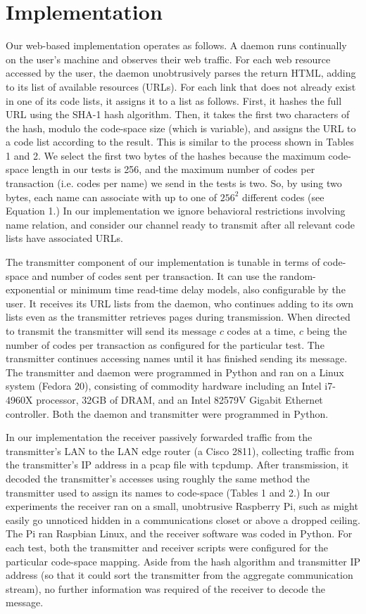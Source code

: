\documentclass[10pt, conference]{IEEEtran}
\begin{document}
\section{Implementation}

Our web-based implementation operates as follows.  A daemon runs continually on the user's machine and observes their web traffic.  For each web resource accessed by the user, the daemon unobtrusively parses the return HTML, adding to its list of available resources (URLs).  For each link that does not already exist in one of its code lists, it assigns it to a list as follows.  First, it hashes the full URL using the SHA-1 hash algorithm.  Then, it takes the first two characters of the hash, modulo the code-space size (which is variable), and assigns the URL to a code list according to the result.  This is similar to the process shown in Tables 1 and 2.  We select the first two bytes of the hashes because the maximum code-space length in our tests is 256, and the maximum number of codes per transaction (i.e. codes per name) we send in the tests is two.  So, by using two bytes, each name can associate with up to one of $256^2$ different codes (see Equation 1.)  In our implementation we ignore behavioral restrictions involving name relation, and consider our channel ready to transmit after all relevant code lists have associated URLs.

The transmitter component of our implementation is tunable in terms of code-space and number of codes sent per transaction.  It can use the random-exponential or minimum time read-time delay models, also configurable by the user. It receives its URL lists from the daemon, who continues adding to its own lists even as the transmitter retrieves pages during transmission.  When directed to transmit the transmitter will send its message $c$ codes at a time, $c$ being the number of codes per transaction as configured for the particular test.  The transmitter continues accessing names until it has finished sending its message.  The transmitter and daemon were programmed in Python and ran on a Linux system (Fedora 20), consisting of commodity hardware including an Intel i7-4960X processor, 32GB of DRAM, and an Intel 82579V Gigabit Ethernet controller.  Both the daemon and transmitter were programmed in Python.

In our implementation the receiver passively forwarded traffic from the transmitter's LAN to the LAN edge router (a Cisco 2811), collecting traffic from the transmitter's IP address in a pcap file with tcpdump.  After transmission, it decoded the transmitter's accesses using roughly the same method the transmitter used to assign its names to code-space (Tables 1 and 2.)  In our experiments the receiver ran on a small, unobtrusive Raspberry Pi, such as might easily go unnoticed hidden in a communications closet or above a dropped ceiling.  The Pi ran Raspbian Linux, and the receiver software was coded in Python.  For each test, both the transmitter and receiver scripts were configured for the particular code-space mapping.  Aside from the hash algorithm and transmitter IP address (so that it could sort the transmitter from the aggregate communication stream), no further information was required of the receiver to decode the message.
\end{document}
